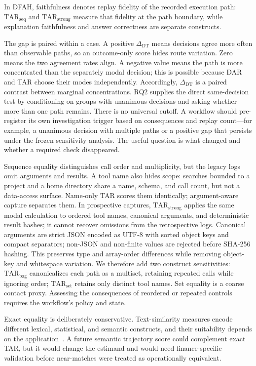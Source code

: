 \documentclass{article}
\newcommand{\tarseq}{\mathrm{TAR}_{\mathrm{seq}}}
\newcommand{\tarbag}{\mathrm{TAR}_{\mathrm{bag}}}
\newcommand{\tarset}{\mathrm{TAR}_{\mathrm{set}}}
\newcommand{\tarstrong}{\mathrm{TAR}_{\mathrm{strong}}}
\newcommand{\gapmetric}{\Delta_{\mathrm{DT}}}
\begin{document}
In DFAH, faithfulness denotes replay fidelity of the recorded execution path:
\(\tarseq\) and \(\tarstrong\) measure that fidelity at the path boundary,
while explanation faithfulness and answer correctness are separate constructs.

The gap is paired within a case.  A positive \(\gapmetric\) means decisions
agree more often than observable paths, so an outcome-only score hides route
variation.  Zero means the two agreement rates align.  A negative value means the path is more concentrated than the
separately modal decision; this is possible because DAR and TAR choose their
modes independently.  Accordingly, \(\gapmetric\) is a paired contrast between
marginal concentrations.  RQ2 supplies
the direct same-decision test by conditioning on groups with unanimous
decisions and asking whether more than one path remains.  There is no universal
cutoff.  A workflow should
pre-register its own investigation trigger based on consequences and replay
count---for example, a unanimous decision with multiple paths or a positive gap
that persists under the frozen sensitivity analysis.  The useful question is
what changed and whether a required check disappeared.

Sequence equality distinguishes call order and multiplicity, but the legacy
logs omit arguments and results.  A tool name also hides scope: searches
bounded to a project and a home directory share a name, schema, and call count,
but not a data-access surface.  Name-only TAR scores them identically;
argument-aware capture separates them.  In prospective captures, \(\tarstrong\)
applies the same modal calculation to ordered tool names, canonical arguments,
and deterministic result hashes; it cannot recover omissions from the
retrospective logs.
Canonical arguments are strict JSON encoded as UTF-8 with sorted object keys
and compact separators; non-JSON and non-finite values are rejected before
SHA-256 hashing.  This preserves type and array-order differences while
removing object-key and whitespace variation.  We
therefore add two construct sensitivities: \(\tarbag\) canonicalizes each path as a multiset,
retaining repeated calls while ignoring order; \(\tarset\) retains only distinct
tool names.  Set equality is a coarse contact proxy.  Assessing the consequences
of reordered or repeated controls requires the workflow's policy and state.

Exact equality is deliberately conservative.  Text-similarity measures encode
different lexical, statistical, and semantic constructs, and their suitability
depends on the application~\citep{li2026similarity}.  A future semantic
trajectory score could complement exact TAR, but it would change the estimand
and would need finance-specific validation before near-matches were treated as
operationally equivalent.
\end{document}
